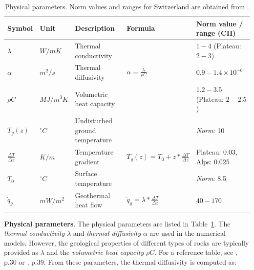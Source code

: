 \begin{table}[b]
\footnotesize
\caption{Physical parameters. Norm values and ranges for Switzerland are obtained from \citep{sia_sondes_2010}.}
\label{tab:phys_params}

\centering
\begin{tabular}{lllll}
\hline
\textbf{Symbol}             & \textbf{Unit} & \textbf{Description}           & \textbf{Formula}                                      & \textbf{Norm value / range (CH)} \\ \hline
$\lambda$                   & $W/mK$        & Thermal conductivity           &                                                       & $1-4$ (Plateau: $2-3$)           \\
$\alpha$                    & $m^2/s$       & Thermal diffusivity            & $\alpha = \frac{\lambda}{\rho C}$                     & $0.9-1.4 \times 10^{-6}$         \\
$\rho C$                    & $MJ/m^3K$      & Volumetric heat capacity       &                                                       & $1.2-3.5$ (Plateau: $2-2.5$)     \\ \hline
$T_g(z)$                    & $^\circ C$    & Undisturbed ground temperature &                                                       & \textit{Norm}: 10                         \\
$\frac{\Delta T}{\Delta z}$ & $K/m$         & Temperature gradient           & $T_g(z) = T_0 + z * \frac{\Delta T}{\Delta z} $       & Plateau: 0.03, Alps: 0.025       \\
$T_0$                       & $^\circ C$    & Surface temperature            &                                                       & \textit{Norm}: 8.5                        \\ \hline
$\dot{q}_{g}$               & $mW/m^2$      & Geothermal heat flow           & $\dot{q}_{g} = \lambda * \frac{\Delta T}{\Delta z}$   & $40-170$                         \\ \hline
\end{tabular}
\end{table}

\textbf{Physical parameters}. The physical parameters are listed in Table~\ref{tab:phys_params}. The \textit{thermal conductivity} $\lambda$ and \textit{thermal diffusivity} $\alpha$ are used in the numerical models. However, the geological properties of different types of rocks are typically provided as $\lambda$ and the \textit{volumetric heat capacity} $\rho C$. For a reference table, see \cite{pahud_geothermal_2002}, p.30 or \cite{sia_sondes_2010}, p.39. From these parameters, the thermal diffusivity is computed as:

